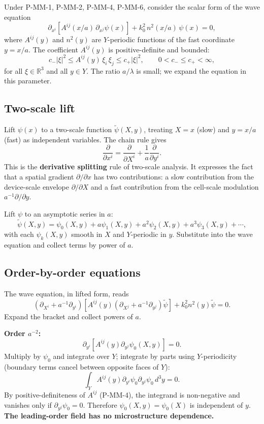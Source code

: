 \documentclass[11pt,a4paper]{article}
\begin{document}
Under P-MM-1, P-MM-2, P-MM-4, P-MM-6, consider the scalar form of the wave equation
\[
\partial_{x^i}\!\left[A^{ij}\!\left(x/a\right)\,\partial_{x^j}\psi(x)\right] + k_0^2\,n^2\!\left(x/a\right)\,\psi(x) = 0,
\]
where $A^{ij}(y)$ and $n^2(y)$ are $Y$-periodic functions of the fast coordinate $y = x/a$. The coefficient $A^{ij}(y)$ is positive-definite and bounded:
\[
c_- |\xi|^2 \le A^{ij}(y)\,\xi_i\,\xi_j \le c_+ |\xi|^2, \qquad 0 < c_- \le c_+ < \infty,
\]
for all $\xi \in \mathbb{R}^3$ and all $y \in Y$. The ratio $a/\lambda$ is small; we expand the equation in this parameter.

\subsection{Two-scale lift}

Lift $\psi(x)$ to a two-scale function $\tilde\psi(X, y)$, treating $X = x$ (slow) and $y = x/a$ (fast) as independent variables. The chain rule gives
\[
\frac{\partial}{\partial x^i} = \frac{\partial}{\partial X^i} + \frac{1}{a}\frac{\partial}{\partial y^i}.
\]
This is the \textbf{derivative splitting} rule of two-scale analysis. It expresses the fact that a spatial gradient $\partial/\partial x$ has two contributions: a slow contribution from the device-scale envelope $\partial/\partial X$ and a fast contribution from the cell-scale modulation $a^{-1}\partial/\partial y$.

Lift $\psi$ to an asymptotic series in $a$:
\[
\tilde\psi(X, y) = \psi_0(X, y) + a\psi_1(X, y) + a^2\psi_2(X, y) + a^3\psi_3(X, y) + \cdots,
\]
with each $\psi_k(X, y)$ smooth in $X$ and $Y$-periodic in $y$. Substitute into the wave equation and collect terms by power of $a$.

\subsection{Order-by-order equations}

The wave equation, in lifted form, reads
\[
\left(\partial_{X^i} + a^{-1}\partial_{y^i}\right)\!\left[A^{ij}(y)\left(\partial_{X^j} + a^{-1}\partial_{y^j}\right)\tilde\psi\right] + k_0^2 n^2(y)\tilde\psi = 0.
\]
Expand the bracket and collect powers of $a$.

\textbf{Order $a^{-2}$:}
\[
\partial_{y^i}\!\left[A^{ij}(y)\partial_{y^j}\psi_0(X, y)\right] = 0.
\]
Multiply by $\psi_0$ and integrate over $Y$; integrate by parts using $Y$-periodicity (boundary terms cancel between opposite faces of $Y$):
\[
\int_Y A^{ij}(y)\partial_{y^i}\psi_0\partial_{y^j}\psi_0\, d^3y = 0.
\]
By positive-definiteness of $A^{ij}$ (P-MM-4), the integrand is non-negative and vanishes only if $\partial_{y^j}\psi_0 = 0$. Therefore $\psi_0(X, y) = \psi_0(X)$ is independent of $y$. \textbf{The leading-order field has no microstructure dependence.}
\end{document}
